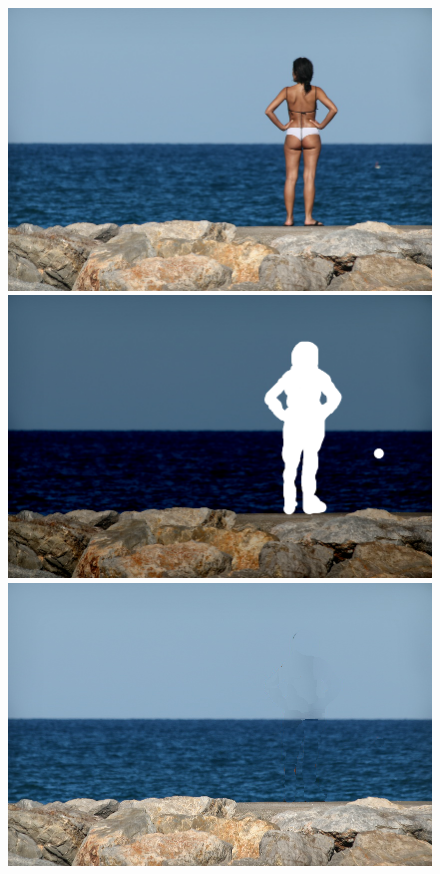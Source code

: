 \documentclass[a4paper, 10pt]{article}
\begin{document}
\begin{figure}
\begin{minipage}{.4\textwidth}
\centering
\includegraphics[scale=0.15]{images/women.png}
\end{minipage}%
\begin{minipage}{.4\textwidth}
\centering
\includegraphics[scale=0.15]{images/women-mask.png}
\end{minipage}%
\begin{minipage}{.4\textwidth}
\centering
\includegraphics[scale=0.15]{inpainted_women27.png}
\end{minipage}%
\end{figure}
\end{document}
